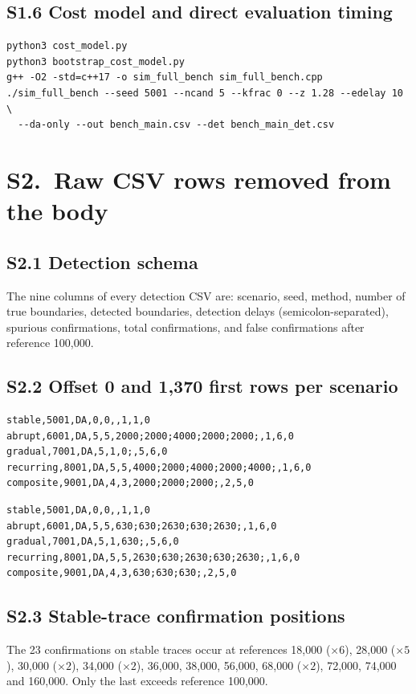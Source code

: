 \documentclass[journal]{IEEEtran}
\begin{document}
\subsection{S1.6 Cost model and direct evaluation timing}
\begin{verbatim}
python3 cost_model.py
python3 bootstrap_cost_model.py
g++ -O2 -std=c++17 -o sim_full_bench sim_full_bench.cpp
./sim_full_bench --seed 5001 --ncand 5 --kfrac 0 --z 1.28 --edelay 10 \
  --da-only --out bench_main.csv --det bench_main_det.csv
\end{verbatim}

\section{S2.\ Raw CSV rows removed from the body}

\subsection{S2.1 Detection schema}
The nine columns of every detection CSV are: scenario, seed, method, number of
true boundaries, detected boundaries, detection delays (semicolon-separated),
spurious confirmations, total confirmations, and false confirmations after
reference 100,000.

\subsection{S2.2 Offset 0 and 1{,}370 first rows per scenario}
\begin{verbatim}
stable,5001,DA,0,0,,1,1,0
abrupt,6001,DA,5,5,2000;2000;4000;2000;2000;,1,6,0
gradual,7001,DA,5,1,0;,5,6,0
recurring,8001,DA,5,5,4000;2000;4000;2000;4000;,1,6,0
composite,9001,DA,4,3,2000;2000;2000;,2,5,0
\end{verbatim}
\begin{verbatim}
stable,5001,DA,0,0,,1,1,0
abrupt,6001,DA,5,5,630;630;2630;630;2630;,1,6,0
gradual,7001,DA,5,1,630;,5,6,0
recurring,8001,DA,5,5,2630;630;2630;630;2630;,1,6,0
composite,9001,DA,4,3,630;630;630;,2,5,0
\end{verbatim}

\subsection{S2.3 Stable-trace confirmation positions}
The 23 confirmations on stable traces occur at references
18{,}000 ($\times 6$), 28{,}000 ($\times 5$), 30{,}000 ($\times 2$),
34{,}000 ($\times 2$), 36{,}000, 38{,}000, 56{,}000, 68{,}000 ($\times 2$),
72{,}000, 74{,}000 and 160{,}000. Only the last exceeds reference 100{,}000.
\end{document}
